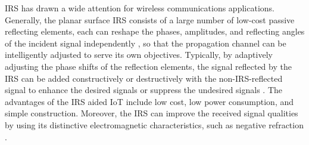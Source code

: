 \documentclass[10pt,journal,letterpaper,twocolumn,twoside]{IEEEtran} %
\begin{document}
IRS has drawn a wide attention for wireless communications applications.
Generally, the planar surface IRS consists of a large number of low-cost passive reflecting elements, each can reshape the phases, amplitudes, and reflecting angles of the incident signal independently \cite{QWu20Towards}, so that the propagation channel can be  intelligently adjusted to serve its own objectives.
Typically, by adaptively adjusting the phase shifts of the reflection elements, the signal reflected
by the IRS can be added constructively or destructively with the non-IRS-reflected signal to enhance the desired
signals or suppress the undesired signals \cite{Tan16Increasing}.
The advantages of the IRS aided IoT include low cost, low power consumption,  and simple construction. Moreover, the IRS  can improve  the received signal qualities by using its distinctive electromagnetic characteristics, such as negative refraction  \cite{GYu20Design}.
\end{document}
